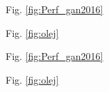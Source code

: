 Fig. \ref{fig:Perf_gan2016}

Fig. \ref{fig:olej}




Fig. \ref{fig:Perf_gan2016}

Fig. \ref{fig:olej}

